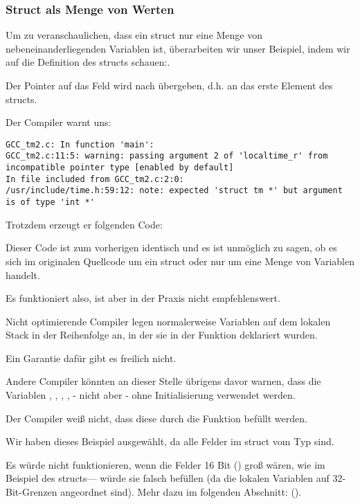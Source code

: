 \subsubsection{Struct als Menge von Werten}
Um zu veranschaulichen, dass ein struct nur eine Menge von nebeneinanderliegenden Variablen ist, überarbeiten wir unser
Beispiel, indem wir auf die Definition des  structs schauen:.



Der Pointer auf das Feld  wird nach  übergeben, d.h. an das erste Element des structs.

Der Compiler warnt uns:

\begin{lstlisting}[caption=GCC 4.7.3]
GCC_tm2.c: In function 'main':
GCC_tm2.c:11:5: warning: passing argument 2 of 'localtime_r' from incompatible pointer type [enabled by default]
In file included from GCC_tm2.c:2:0:
/usr/include/time.h:59:12: note: expected 'struct tm *' but argument is of type 'int *'
\end{lstlisting}

Trotzdem erzeugt er folgenden Code:


Dieser Code ist zum vorherigen identisch und es ist unmöglich zu sagen, ob es sich im originalen Quellcode um ein struct
oder nur um eine Menge von Variablen handelt.

Es funktioniert also, ist aber in der Praxis nicht empfehlenswert. 

Nicht optimierende Compiler legen normalerweise Variablen auf dem lokalen Stack in der Reihenfolge an, in der sie in der
Funktion deklariert wurden.

Ein Garantie dafür gibt es freilich nicht.

Andere Compiler könnten an dieser Stelle übrigens davor warnen, dass die Variablen , , ,
,  - nicht aber  - ohne Initialisierung verwendet werden.

Der Compiler weiß nicht, dass diese durch die Funktion  befüllt werden.

Wir haben dieses Beispiel ausgewählt, da alle Felder im struct vom Typ \Tint sind.

Es würde nicht funktionieren, wenn die Felder 16 Bit () groß wären, wie im Beispiel des 
structs--- würde sie falsch befüllen (da die lokalen Variablen auf 32-Bit-Grenzen angeordnet sind).
Mehr dazu im folgenden Abschnitt: \q{\StructurePackingSectionName} ().

